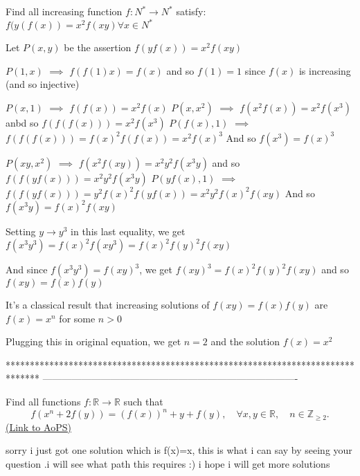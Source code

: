 \begin{solution}
	\begin{tcolorbox}Find all increasing function $f: N^* \rightarrow N^*$ satisfy:
$f(y(f(x))=x^2f(xy) \forall x\in N^*$\end{tcolorbox}
Let $P(x,y)$ be the assertion $f(yf(x))=x^2f(xy)$

$P(1,x)$ $\implies$ $f(f(1)x)=f(x)$ and so $f(1)=1$ since $f(x)$ is increasing (and so injective)

$P(x,1)$ $\implies$ $f(f(x))=x^2f(x)$
$P(x,x^2)$ $\implies$ $f(x^2f(x))=x^2f(x^3)$ anbd so $f(f(f(x)))=x^2f(x^3)$
$P(f(x),1)$ $\implies$ $f(f(f(x)))=f(x)^2f(f(x))=x^2f(x)^3$
And so $f(x^3)=f(x)^3$

$P(xy,x^2)$ $\implies$ $f(x^2f(xy))=x^2y^2f(x^3y)$ and so $f(f(yf(x)))=x^2y^2f(x^3y)$ 
$P(yf(x),1)$ $\implies$ $f(f(yf(x)))=y^2f(x)^2f(yf(x))=x^2y^2f(x)^2f(xy)$
And so $f(x^3y)=f(x)^2f(xy)$

Setting $y\to y^3$ in this last equality, we get $f(x^3y^3)=f(x)^2f(xy^3)=f(x)^2f(y)^2f(xy)$

And since $f(x^3y^3)=f(xy)^3$, we get $f(xy)^3=f(x)^2f(y)^2f(xy)$ and so $f(xy)=f(x)f(y)$

It's a classical result that increasing solutions of $f(xy)=f(x)f(y)$ are $f(x)=x^n$ for some $n>0$

Plugging this in original equation, we get $n=2$ and the solution $\boxed{f(x)=x^2}$
\end{solution}
*******************************************************************************
-------------------------------------------------------------------------------

\begin{problem}
	Find all functions $f: \mathbb R\to \mathbb R$ such that
\[f(x^n+2f(y))=(f(x))^n +y+f(y), \quad \forall x, y \in \mathbb R,\quad n \in \mathbb Z_{\geq 2}.\]
	\flushright \href{https://artofproblemsolving.com/community/c6h385331}{(Link to AoPS)}
\end{problem}



\begin{solution}
	sorry i just got one solution which is f(x)=x,
this is what i can say by seeing your question .i will see what path this requires :) 
i hope i will get more solutions
\end{solution}



